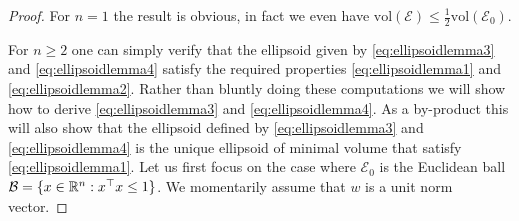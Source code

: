 \begin{proof}
For $n=1$ the result is obvious, in fact we even have $\mathrm{vol}(\mathcal{E}) \leq \frac12 \mathrm{vol}(\mathcal{E}_0) .$

For $n \geq 2$ one can simply verify that the ellipsoid given by \eqref{eq:ellipsoidlemma3} and \eqref{eq:ellipsoidlemma4} satisfy the required properties \eqref{eq:ellipsoidlemma1} and \eqref{eq:ellipsoidlemma2}. Rather than bluntly doing these computations we will show how to derive \eqref{eq:ellipsoidlemma3} and \eqref{eq:ellipsoidlemma4}. As a by-product this will also show that the ellipsoid defined by \eqref{eq:ellipsoidlemma3} and \eqref{eq:ellipsoidlemma4} is the unique ellipsoid of minimal volume that satisfy \eqref{eq:ellipsoidlemma1}. Let us first focus on the case where $\mathcal{E}_0$ is the Euclidean ball $\mathcal{B} = \{x \in \mathbb{R}^n : x^{\top} x \leq 1\}$. We momentarily assume that $w$ is a unit norm vector. 


\end{proof}
